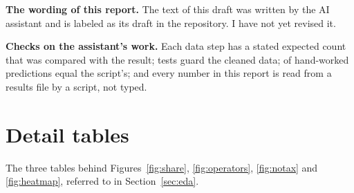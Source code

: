 \textbf{The wording of this report.} \ifdraft The text of this draft was written by the AI assistant and is labeled as its draft in the repository. I have not yet revised it.  \fi

\textbf{Checks on the assistant's work.} Each data step has a stated expected count that was compared with the result;  tests guard the cleaned data;  of  hand-worked predictions equal the script's; and every number in this report is read from a results file by a script, not typed.

\section{Detail tables}

The three tables behind Figures~\ref{fig:share}, \ref{fig:operators}, \ref{fig:notax} and \ref{fig:heatmap}, referred to in Section~\ref{sec:eda}.

\begin{table}[H]
\centering\footnotesize\setlength{\tabcolsep}{4pt}
\caption{Free play per \$100 wagered and share of all dollars wagered, by operator. Lower and Upper are the lower and upper quartiles, in dollars per \$100; Share is the share of all dollars wagered. Source: output/tables/eda\_03 and eda\_04.}\label{tab:operators}

\end{table}

\begin{table}[H]
\centering\small
\caption{Months with no state tax paid, by year and operator type. Source: output/tables/eda\_09.}\label{tab:notax}

\end{table}

\begin{table}[H]
\centering\small
\caption{Correlation of each target with the variables known before the month starts. Source: output/tables/eda\_12c.}\label{tab:corr}

\end{table}
